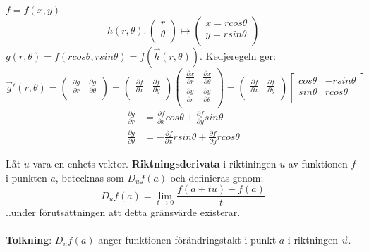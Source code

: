 \documentclass{report}
\begin{document}
\ex{}
{
$ f = f(x,y) $
\begin{equation*}
h(r, \theta) :
\begin{pmatrix}
	r \\
	\theta \\
\end{pmatrix}
\mapsto 
\begin{pmatrix}
	x = rcos\theta \\
	y = rsin\theta \\
\end{pmatrix}
\end{equation*}
$ g(r, \theta) = f(rcos\theta, rsin\theta) = f( \vec{h} (r,\theta)) $. Kedjeregeln ger:
\begin{equation*}
\vec{g} '(r, \theta) =
\begin{pmatrix}
	\frac{\partial g }{\partial r }  & \frac{\partial g }{\partial \theta }  \\
\end{pmatrix}
=
\begin{pmatrix}
	\frac{\partial f }{\partial x }  & \frac{\partial f }{\partial y }  \\
\end{pmatrix}
\begin{pmatrix}
	\frac{\partial x }{\partial r }  & \frac{\partial x }{\partial \theta }  \\
	\frac{\partial y }{\partial r }  & \frac{\partial y }{\partial \theta }  \\
\end{pmatrix}
=
\begin{pmatrix}
	\frac{\partial f }{\partial x }  & \frac{\partial f }{\partial y }  \\
\end{pmatrix}
\begin{bmatrix}
	cos\theta & -rsin\theta \\
	sin\theta & rcos\theta \\
\end{bmatrix}
\end{equation*}
\begin{align*}
	\frac{\partial g }{\partial r } &= \frac{\partial f }{\partial x } cos\theta + \frac{\partial f }{\partial y } sin\theta\\
	\frac{\partial g }{\partial \theta } &= - \frac{\partial f }{\partial x } rsin\theta + \frac{\partial f }{\partial y } rcos\theta
\end{align*}
}

{
Låt $ u $ vara en enhets vektor. \textbf{Riktningsderivata} i riktiningen $ u $ av funktionen $ f $ i punkten $ a $, betecknas som $ D_uf(a) $ och definieras genom:
\begin{equation*}
D_uf(a) = \lim_{t \to 0}  \frac{f(a+tu)-f(a)}{t} 
\end{equation*}
..under förutsättningen att detta gränsvärde existerar.\\\\

\textbf{Tolkning}: $ D_uf(a) $ anger funktionen förändringstakt i punkt $ a $ i riktningen $ \vec{u}  $. 
}
\end{document}
